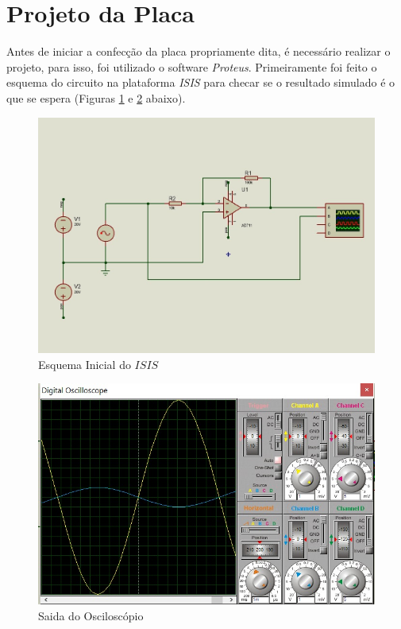 \documentclass[14pt, oneside]{book}
\newcommand\tab[1][1cm]{\hspace*{#1}}
\theoremstyle{definition}
\begin{document}
            \section{Projeto da Placa}
                \tab Antes de iniciar a confecção da placa propriamente dita, é necessário realizar o projeto, para isso, foi utilizado o software \textit{Proteus}. Primeiramente foi feito o esquema do circuito na plataforma \textit{ISIS} para checar se o resultado simulado é o que se espera (Figuras \ref{inicio} e \ref{top} abaixo). \\
                \begin{figure}[H]
                    \centering
                    \includegraphics[scale= 0.32]{Simulacao_circuito(osciloscopio).jpeg}
                    \caption{Esquema Inicial do $ISIS$}
                    \label{inicio}
                \end{figure}
                \begin{figure}[H]
                    \centering
                    \includegraphics[scale= 0.35]{Osciloscopio.jpeg}
                    \caption{Saida do Osciloscópio}
                    \label{top}
                \end{figure}
\end{document}

